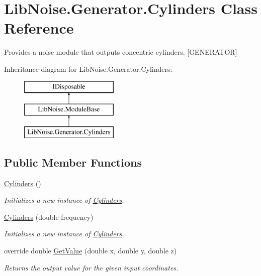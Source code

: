 \hypertarget{class_lib_noise_1_1_generator_1_1_cylinders}{}\section{Lib\+Noise.\+Generator.\+Cylinders Class Reference}
\label{class_lib_noise_1_1_generator_1_1_cylinders}


Provides a noise module that outputs concentric cylinders. \mbox{[}G\+E\+N\+E\+R\+A\+T\+OR\mbox{]}  


Inheritance diagram for Lib\+Noise.\+Generator.\+Cylinders\+:\begin{figure}[H]
\begin{center}
\leavevmode
\includegraphics[height=3.000000cm]{class_lib_noise_1_1_generator_1_1_cylinders}
\end{center}
\end{figure}
\subsection*{Public Member Functions}
\begin{DoxyCompactItemize}
\item 
\hyperlink{class_lib_noise_1_1_generator_1_1_cylinders_a28c8d4d020928b281bb65b0d8c37c178}{Cylinders} ()
\begin{DoxyCompactList}\small\item\em Initializes a new instance of \hyperlink{class_lib_noise_1_1_generator_1_1_cylinders}{Cylinders}. \end{DoxyCompactList}\item 
\hyperlink{class_lib_noise_1_1_generator_1_1_cylinders_a044e0bbbbedf5f7eabad4e71a9c6dea8}{Cylinders} (double frequency)
\begin{DoxyCompactList}\small\item\em Initializes a new instance of \hyperlink{class_lib_noise_1_1_generator_1_1_cylinders}{Cylinders}. \end{DoxyCompactList}\item 
override double \hyperlink{class_lib_noise_1_1_generator_1_1_cylinders_af6be6375a1d1e4ce7c78852abd298f12}{Get\+Value} (double x, double y, double z)
\begin{DoxyCompactList}\small\item\em Returns the output value for the given input coordinates. \end{DoxyCompactList}\end{DoxyCompactItemize}
